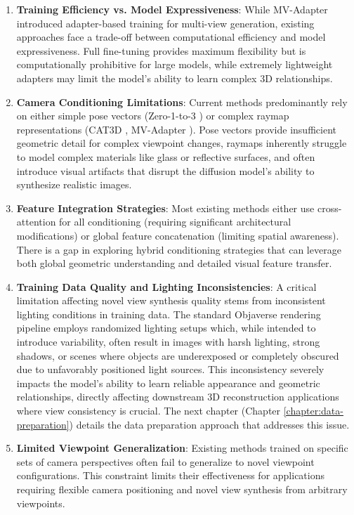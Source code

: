 \begin{enumerate}
  \item \textbf{Training Efficiency vs. Model Expressiveness}: While MV-Adapter \cite{mvadapter} introduced adapter-based training for multi-view generation, existing approaches face a trade-off between computational efficiency and model expressiveness. Full fine-tuning provides maximum flexibility but is computationally prohibitive for large models, while extremely lightweight adapters may limit the model's ability to learn complex 3D relationships.

  \item \textbf{Camera Conditioning Limitations}: Current methods predominantly rely on either simple pose vectors (Zero-1-to-3 \cite{zero1to3}) or complex raymap representations (CAT3D \cite{cat3d}, MV-Adapter \cite{mvadapter}). Pose vectors provide insufficient geometric detail for complex viewpoint changes, raymaps inherently struggle to model complex materials like glass or reflective surfaces, and often introduce visual artifacts that disrupt the diffusion model's ability to synthesize realistic images.

  \item \textbf{Feature Integration Strategies}: Most existing methods either use cross-attention for all conditioning (requiring significant architectural modifications) or global feature concatenation (limiting spatial awareness). There is a gap in exploring hybrid conditioning strategies that can leverage both global geometric understanding and detailed visual feature transfer.

  \item \textbf{Training Data Quality and Lighting Inconsistencies}: A critical limitation affecting novel view synthesis quality stems from inconsistent lighting conditions in training data. The standard Objaverse rendering pipeline employs randomized lighting setups which, while intended to introduce variability, often result in images with harsh lighting, strong shadows, or scenes where objects are underexposed or completely obscured due to unfavorably positioned light sources. This inconsistency severely impacts the model's ability to learn reliable appearance and geometric relationships, directly affecting downstream 3D reconstruction applications where view consistency is crucial. The next chapter (Chapter \ref{chapter:data-preparation}) details the data preparation approach that addresses this issue.

  \item \textbf{Limited Viewpoint Generalization}: Existing methods trained on specific sets of camera perspectives often fail to generalize to novel viewpoint configurations. This constraint limits their effectiveness for applications requiring flexible camera positioning and novel view synthesis from arbitrary viewpoints.


\end{enumerate}
